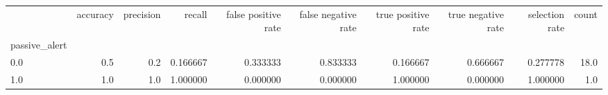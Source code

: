 \begin{tabular}{lrrrrrrrrr}
\toprule
{} &  accuracy &  precision &    recall &  false positive rate &  false negative rate &  true positive rate &  true negative rate &  selection rate &  count \\
passive\_alert &           &            &           &                      &                      &                     &                     &                 &        \\
\midrule
0.0           &       0.5 &        0.2 &  0.166667 &             0.333333 &             0.833333 &            0.166667 &            0.666667 &        0.277778 &   18.0 \\
1.0           &       1.0 &        1.0 &  1.000000 &             0.000000 &             0.000000 &            1.000000 &            0.000000 &        1.000000 &    1.0 \\
\bottomrule
\end{tabular}
